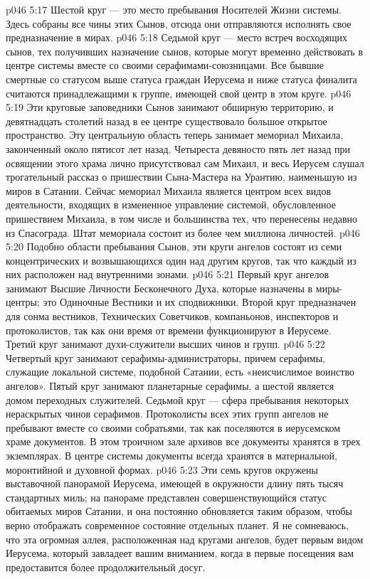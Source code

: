 \vs p046 5:17 Шестой круг --- это место пребывания Носителей Жизни системы. Здесь собраны все чины этих Сынов, отсюда они отправляются исполнять свое предназначение в мирах.
\vs p046 5:18 Седьмой круг --- место встреч восходящих сынов, тех получивших назначение сынов, которые могут временно действовать в центре системы вместе со своими серафимами\hyp{}союзницами. Все бывшие смертные со статусом выше статуса граждан Иерусема и ниже статуса финалита считаются принадлежащими к группе, имеющей свой центр в этом круге.
\vs p046 5:19 Эти круговые заповедники Сынов занимают обширную территорию, и девятнадцать столетий назад в ее центре существовало большое открытое пространство. Эту центральную область теперь занимает мемориал Михаила, законченный около пятисот лет назад. Четыреста девяносто пять лет назад при освящении этого храма лично присутствовал сам Михаил, и весь Иерусем слушал трогательный рассказ о пришествии Сына\hyp{}Мастера на Урантию, наименьшую из миров в Сатании. Сейчас мемориал Михаила является центром всех видов деятельности, входящих в измененное управление системой, обусловленное пришествием Михаила, в том числе и большинства тех, что перенесены недавно из Спасограда. Штат мемориала состоит из более чем миллиона личностей.
\vs p046 5:20 \bibnobreakspace {} Подобно области пребывания Сынов, эти круги ангелов состоят из семи концентрических и возвышающихся один над другим кругов, так что каждый из них расположен над внутренними зонами.
\vs p046 5:21 \pc Первый круг ангелов занимают Высшие Личности Бесконечного Духа, которые назначены в миры\hyp{}центры; это Одиночные Вестники и их сподвижники. Второй круг предназначен для сонма вестников, Технических Советчиков, компаньонов, инспекторов и протоколистов, так как они время от времени функционируют в Иерусеме. Третий круг занимают духи\hyp{}служители высших чинов и групп.
\vs p046 5:22 Четвертый круг занимают серафимы\hyp{}администраторы, причем серафимы, служащие локальной системе, подобной Сатании, есть «неисчислимое воинство ангелов». Пятый круг занимают планетарные серафимы, а шестой является домом переходных служителей. Седьмой круг --- сфера пребывания некоторых нераскрытых чинов серафимов. Протоколисты всех этих групп ангелов не пребывают вместе со своими собратьями, так как поселяются в иерусемском храме документов. В этом троичном зале архивов все документы хранятся в трех экземплярах. В центре системы документы всегда хранятся в материальной, моронтийной и духовной формах.
\vs p046 5:23 Эти семь кругов окружены выставочной панорамой Иерусема, имеющей в окружности длину пять тысяч стандартных миль; на панораме представлен совершенствующийся статус обитаемых миров Сатании, и она постоянно обновляется таким образом, чтобы верно отображать современное состояние отдельных планет. Я не сомневаюсь, что эта огромная аллея, расположенная над кругами ангелов, будет первым видом Иерусема, который завладеет вашим вниманием, когда в первые посещения вам предоставится более продолжительный досуг.
